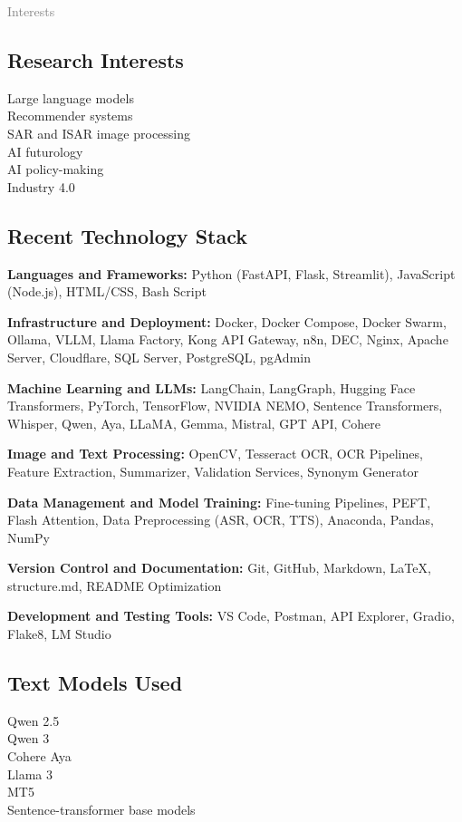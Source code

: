 \documentclass[a4paper]{deedy-resume}
\begin{document}
\begin{minipage}[t]{0.33\textwidth}

\textcolor{gray}{\huge{Interests}}
\vspace{\itemsep}

\subsection*{Research Interests}
Large language models \\
Recommender systems \\
SAR and ISAR image processing \\
AI futurology \\
AI policy-making \\
Industry 4.0 \\

\sectionspace
\subsection*{Recent Technology Stack}
\textbf{Languages and Frameworks:} Python (FastAPI, Flask, Streamlit), JavaScript (Node.js), HTML/CSS, Bash Script

\textbf{Infrastructure and Deployment:} Docker, Docker Compose, Docker Swarm, Ollama, VLLM, Llama Factory, Kong API Gateway, n8n, DEC, Nginx, Apache Server, Cloudflare, SQL Server, PostgreSQL, pgAdmin

\textbf{Machine Learning and LLMs:} LangChain, LangGraph, Hugging Face Transformers, PyTorch, TensorFlow, NVIDIA NEMO, Sentence Transformers, Whisper, Qwen, Aya, LLaMA, Gemma, Mistral, GPT API, Cohere

\textbf{Image and Text Processing:} OpenCV, Tesseract OCR, OCR Pipelines, Feature Extraction, Summarizer, Validation Services, Synonym Generator

\textbf{Data Management and Model Training:} Fine-tuning Pipelines, PEFT, Flash Attention, Data Preprocessing (ASR, OCR, TTS), Anaconda, Pandas, NumPy

\textbf{Version Control and Documentation:} Git, GitHub, Markdown, LaTeX, structure.md, README Optimization

\textbf{Development and Testing Tools:} VS Code, Postman, API Explorer, Gradio, Flake8, LM Studio

\sectionspace
\subsection*{Text Models Used}
Qwen 2.5 \\
Qwen 3 \\
Cohere Aya \\
Llama 3 \\
MT5 \\
Sentence-transformer base models \\


\end{minipage}
\end{document}
